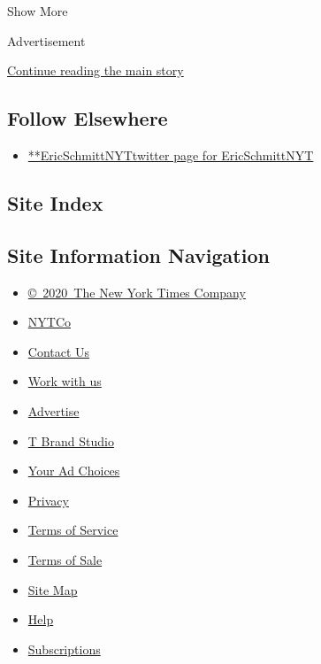 Show More

Advertisement

\protect\hyperlink{after-mid2}{Continue reading the main story}

\hypertarget{follow-elsewhere}{%
\subsection{Follow Elsewhere}\label{follow-elsewhere}}

\begin{itemize}
\tightlist
\item
  \href{https://twitter.com/EricSchmittNYT}{**EricSchmittNYTtwitter page
  for EricSchmittNYT}
\end{itemize}

\hypertarget{site-index}{%
\subsection{Site Index}\label{site-index}}

\hypertarget{site-information-navigation}{%
\subsection{Site Information
Navigation}\label{site-information-navigation}}

\begin{itemize}
\tightlist
\item
  \href{https://help.nytimes.com/hc/en-us/articles/115014792127-Copyright-notice}{©~2020~The
  New York Times Company}
\end{itemize}

\begin{itemize}
\tightlist
\item
  \href{https://www.nytco.com/}{NYTCo}
\item
  \href{https://help.nytimes.com/hc/en-us/articles/115015385887-Contact-Us}{Contact
  Us}
\item
  \href{https://www.nytco.com/careers/}{Work with us}
\item
  \href{https://nytmediakit.com/}{Advertise}
\item
  \href{http://www.tbrandstudio.com/}{T Brand Studio}
\item
  \href{https://www.nytimes.com/privacy/cookie-policy\#how-do-i-manage-trackers}{Your
  Ad Choices}
\item
  \href{https://www.nytimes.com/privacy}{Privacy}
\item
  \href{https://help.nytimes.com/hc/en-us/articles/115014893428-Terms-of-service}{Terms
  of Service}
\item
  \href{https://help.nytimes.com/hc/en-us/articles/115014893968-Terms-of-sale}{Terms
  of Sale}
\item
  \href{https://spiderbites.nytimes.com}{Site Map}
\item
  \href{https://help.nytimes.com/hc/en-us}{Help}
\item
  \href{https://www.nytimes.com/subscription?campaignId=37WXW}{Subscriptions}
\end{itemize}
